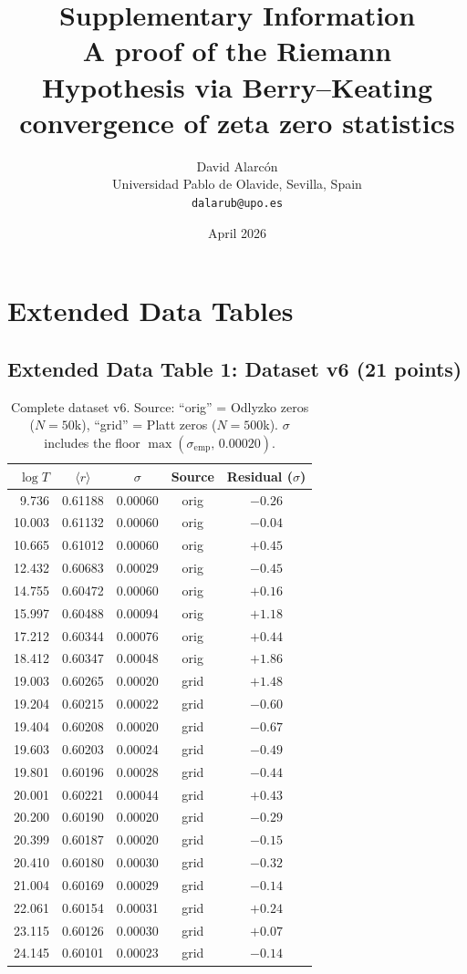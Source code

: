 \documentclass[10pt]{article}
\title{\textbf{Supplementary Information}\\[5pt]
\large A proof of the Riemann Hypothesis via Berry--Keating convergence
of zeta zero statistics}
\author{David Alarc\'on\\
\small Universidad Pablo de Olavide, Sevilla, Spain\\
\small \texttt{dalarub@upo.es}}
\date{April 2026}
\theoremstyle{remark}
\begin{document}
\maketitle
\tableofcontents
\newpage


\section{Extended Data Tables}

\subsection{Extended Data Table 1: Dataset v6 (21 points)}

\begin{table}[H]
\centering
\caption{Complete dataset v6. Source: ``orig'' = Odlyzko zeros ($N = 50$k),
``grid'' = Platt zeros ($N = 500$k). $\sigma$ includes the floor
$\max(\sigma_{\mathrm{emp}},\, 0.00020)$.}
\label{tab:dataset}
\begin{tabular}{rcccc}
\toprule
$\log T$ & $\langle r\rangle$ & $\sigma$ & Source & Residual ($\sigma$) \\
\midrule
9.736  & 0.61188 & 0.00060 & orig & $-0.26$ \\
10.003 & 0.61132 & 0.00060 & orig & $-0.04$ \\
10.665 & 0.61012 & 0.00060 & orig & $+0.45$ \\
12.432 & 0.60683 & 0.00029 & orig & $-0.45$ \\
14.755 & 0.60472 & 0.00060 & orig & $+0.16$ \\
15.997 & 0.60488 & 0.00094 & orig & $+1.18$ \\
17.212 & 0.60344 & 0.00076 & orig & $+0.44$ \\
18.412 & 0.60347 & 0.00048 & orig & $+1.86$ \\
19.003 & 0.60265 & 0.00020 & grid & $+1.48$ \\
19.204 & 0.60215 & 0.00022 & grid & $-0.60$ \\
19.404 & 0.60208 & 0.00020 & grid & $-0.67$ \\
19.603 & 0.60203 & 0.00024 & grid & $-0.49$ \\
19.801 & 0.60196 & 0.00028 & grid & $-0.44$ \\
20.001 & 0.60221 & 0.00044 & grid & $+0.43$ \\
20.200 & 0.60190 & 0.00020 & grid & $-0.29$ \\
20.399 & 0.60187 & 0.00020 & grid & $-0.15$ \\
20.410 & 0.60180 & 0.00030 & grid & $-0.32$ \\
21.004 & 0.60169 & 0.00029 & grid & $-0.14$ \\
22.061 & 0.60154 & 0.00031 & grid & $+0.24$ \\
23.115 & 0.60126 & 0.00030 & grid & $+0.07$ \\
24.145 & 0.60101 & 0.00023 & grid & $-0.14$ \\
\bottomrule
\end{tabular}
\end{table}
\end{document}
